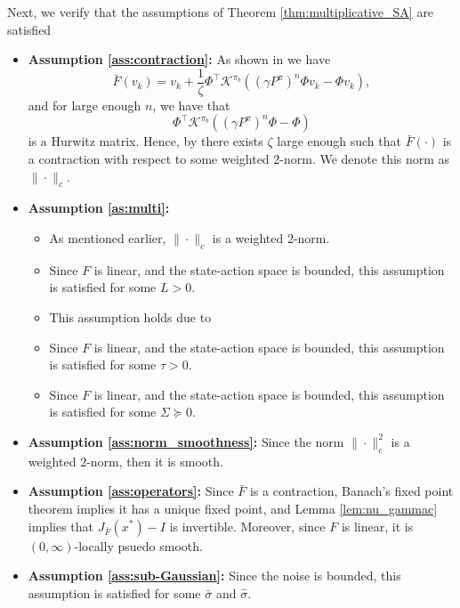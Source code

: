 \documentclass[letterpaper, 10 pt]{article}
\begin{document}
        Next, we verify that the assumptions of Theorem \ref{thm:multiplicative_SA} are satisfied
        \begin{itemize}
        \item \textbf{Assumption \ref{ass:contraction}:} As shown in \cite[Proposition 3.1]{chen2021finite} we have
        \[ \bar{F}(v_k)=v_k+\frac{1}{\zeta}\Phi^\top \mathcal{K}^{\pi_b} ((\gamma P^\pi)^n\Phi v_k - \Phi v_k), \]
        and for large enough $n$, we have that
        \[ \Phi^\top \mathcal{K}^{\pi_b} ((\gamma P^\pi)^n\Phi  - \Phi ) \]
        is a Hurwitz matrix. Hence, by \cite[Page 46 footnote]{bertsekas1995dynamic2} there exists $\zeta$ large enough such that $\bar{F}(\cdot)$ is a contraction with respect to some weighted 2-norm. We denote this norm as $\|\cdot\|_c$.
        \item \textbf{Assumption \ref{as:multi}:}
        \begin{itemize}
            \item[(i)] As mentioned earlier, $\|\cdot\|_c$ is a weighted 2-norm.
            \item[(ii)] Since $F$ is linear, and the state-action space is bounded, this assumption is satisfied for some $L>0$.
            \item[(iii)] This assumption holds due to \cite[Lemma 9]{tsitsiklis1997analysis}
            \item[(iv)] Since $F$ is linear, and the state-action space is bounded, this assumption is satisfied for some $\tau>0$.
            \item[(v)] Since $F$ is linear, and the state-action space is bounded, this assumption is satisfied for some $\Sigma\succeq0$.
        \end{itemize}
        \item \textbf{Assumption \ref{ass:norm_smoothness}:}
        Since the norm $\|\cdot\|_c^2$ is a weighted $2$-norm, then it is smooth.
        \item \textbf{Assumption \ref{ass:operators}:} Since $\bar{F}$ is a contraction, Banach's fixed point theorem implies it has a unique fixed point, and Lemma \ref{lem:nu_gammac} implies that $J_{\bar{F}}(x^*)-I$ is invertible. Moreover, since $F$ is linear, it is $(0,\infty)$-locally psuedo smooth.
        \item \textbf{Assumption \ref{ass:sub-Gaussian}:} Since the noise is bounded, this assumption is satisfied for some $\bar{\sigma}$ and $\hat{\sigma}$.
    \end{itemize}
\end{document}
